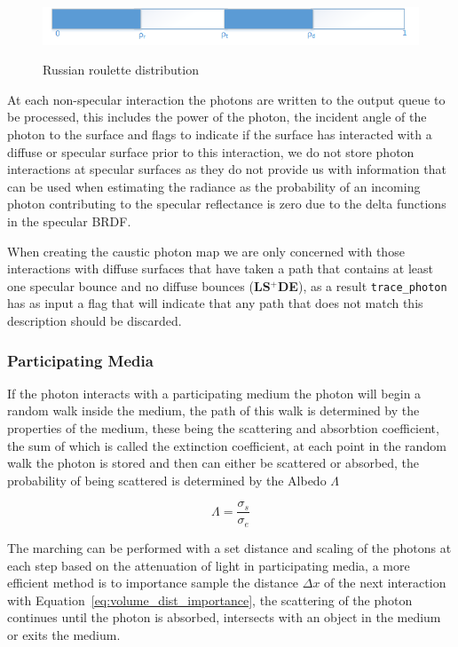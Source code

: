 \begin{figure}[h]
\includegraphics{./images/russian_roulette_distribution.png}
\label{fig:rr_dist}
\caption{Russian roulette distribution}
\end{figure}

At each non-specular interaction the photons are written to the output queue to be processed, this includes
the power of the photon, the incident angle of the photon to the surface and flags to indicate if the surface
has interacted with a diffuse or specular surface prior to this interaction, we do not store photon interactions
at specular surfaces as they do not provide us with information that can be used when estimating the radiance as
the probability of an incoming photon contributing to the specular reflectance is zero due to the delta functions
in the specular BRDF.

When creating the caustic photon map we are only concerned with those interactions with diffuse surfaces that have
taken a path that contains at least one specular bounce and no diffuse bounces (\textbf{LS$^+$DE}), as a result \texttt{trace\_photon}
has as input a flag that will indicate that any path that does not match this description should be discarded.

\subsubsection{Participating Media}
If the photon interacts with a participating medium the photon will begin a random walk inside the medium, the path of this walk
is determined by the properties of the medium, these being the scattering and absorbtion coefficient, the sum of which
is called the extinction coefficient, at each point in the random walk the photon is stored and then can either be
scattered or absorbed, the probability of being scattered is determined by the Albedo $\Lambda$


\begin{equation}
\Lambda = \frac{\sigma_s}{\sigma_e}
\end{equation}

The marching can be performed with a set distance and scaling of the photons at each step based on the attenuation of
light in participating media, a more efficient \cite{JensenBook} method is to importance sample the distance $\Delta x$ of the next interaction with 
Equation~\ref{eq:volume_dist_importance}, the scattering of the photon continues until the photon is absorbed, intersects
with an object in the medium or exits the medium. 

